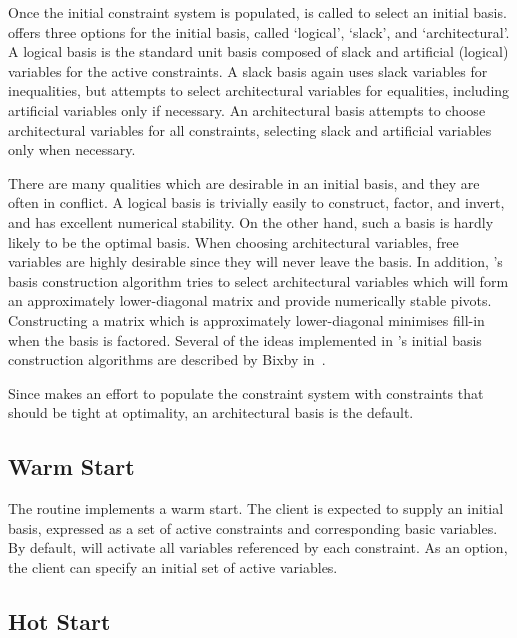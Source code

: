 Once the initial constraint system is populated,  is called to
select an initial basis.
\dylp offers three options for the initial basis, called `logical', `slack',
and `architectural'.
A logical basis is the standard unit basis composed of slack and artificial
(logical) variables for the active constraints.
A slack basis again uses slack variables for inequalities, but attempts to
select architectural variables for equalities, including artificial variables
only if necessary.
An architectural basis attempts to choose architectural variables for all
constraints, selecting slack and artificial variables only when necessary.

There are many qualities which are desirable in an initial basis, and they
are often in conflict.
A logical basis is trivially easily to construct, factor, and invert, and
has excellent numerical stability.
On the other hand, such a basis is hardly likely to be the optimal basis.
When choosing architectural variables, free variables are highly desirable
since they will never leave the basis.
In addition, \dylp's basis construction algorithm tries to select architectural
variables which will form an approximately lower-diagonal matrix and
provide numerically stable pivots.
Constructing a matrix which is approximately lower-diagonal minimises fill-in
when the basis is factored.
Several of the ideas implemented in \dylp's initial basis
construction algorithms are described by Bixby in~\cite{Bix92a}.

Since \dylp makes an effort to populate the constraint system with
constraints that should be tight at optimality, an architectural basis
is the default.

\subsection{Warm Start}
\label{sec:WarmStart}

The routine  implements a warm start.
The client is expected to supply an initial basis,
expressed as a set of active constraints and corresponding basic variables.
By default, \dylp will activate all variables referenced by each constraint.
As an option, the client can specify an initial set of active variables.

\subsection{Hot Start}
\label{sec:HotStart}

